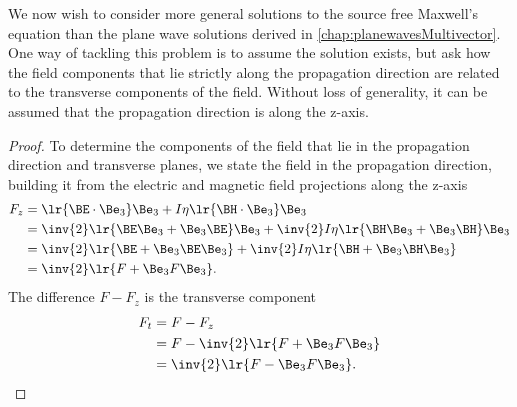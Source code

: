 %
%
We now wish to consider more general solutions to the source free Maxwell's equation than the plane wave solutions derived in \cref{chap:planewavesMultivector}.
One way of tackling this problem is to assume the solution exists, but ask how the field components that lie strictly along the propagation direction are related to the transverse components of the field.
Without loss of generality, it can be assumed that the propagation direction is along the z-axis.

\begin{proof}
To determine the components of the field that lie in the propagation direction and transverse planes, we state the field in the propagation direction, building it from the electric and magnetic field projections along the z-axis
\begin{equation}\label{eqn:transverseField:108}
\begin{aligned}
F_z
&=
\lr{ \BE \cdot \Be_3 }
 \Be_3
+ I \eta \lr{ \BH \cdot \Be_3 } \Be_3 \\
&=
\inv{2}
\lr{ \BE \Be_3 + \Be_3 \BE }
 \Be_3
+ \inv{2} I \eta \lr{ \BH \Be_3 + \Be_3 \BH } \Be_3 \\
&=
\inv{2}
\lr{ \BE + \Be_3 \BE \Be_3 }
+ \inv{2} I \eta \lr{ \BH + \Be_3 \BH \Be_3 } \\
&=
\inv{2} \lr{ F + \Be_3 F \Be_3 }.
\end{aligned}
\end{equation}
The difference \( F - F_z \) is the transverse component
\begin{equation}\label{eqn:transverseField:308}
\begin{aligned}
F_t
&= F - F_z \\
&= F - \inv{2} \lr{ F + \Be_3 F \Be_3 } \\
&= \inv{2} \lr{ F - \Be_3 F \Be_3 }.
\end{aligned}
\end{equation}
\end{proof}

